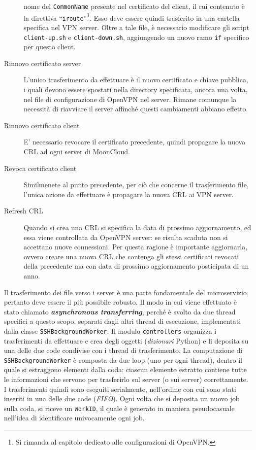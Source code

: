 \begin{description}
	nome del \texttt{CommonName} presente nel certificato del client, il cui
	contenuto è la direttiva ``\texttt{iroute}''\footnote{Si rimanda al capitolo dedicato
	alle configurazioni di OpenVPN.}. Esso deve essere quindi trasferito in una cartella
	specifica nel VPN server. Oltre a tale file, è necessario modificare gli script
	\texttt{client-up.sh} e \texttt{client-down.sh}, aggiungendo un nuovo ramo
	\texttt{if} specifico per questo client.
	\item[Rinnovo certificato server]L'unico trasferimento da effettuare è il nuovo
	certificato e chiave pubblica, i quali devono essere spostati nella directory
	specificata, ancora una volta, nel file di configurazione di OpenVPN nel server.
	Rimane comunque la necessità di riavviare il server affinché questi cambiamenti abbiano
	effetto.
	\item[Rinnovo certificato client]E' necessario revocare il certificato precedente,
	quindi propagare la nuova CRL ad ogni server di MoonCloud.
	\item[Revoca certificato client]Similmenete al punto precedente, per ciò che concerne
	il trasferimento file, l'unica azione da effettuare è propagare la nuova
	CRL ai VPN server.
	\item[Refresh CRL]Quando si crea una CRL si specifica la data di prossimo aggiornamento,
	ed essa viene controllata da OpenVPN server: se risulta scaduta non si accettano nuove
	connessioni. Per questa ragione è importante aggiornarla, ovvero creare una nuova
	CRL che contenga gli stessi certificati revocati della precedente ma con
	data di prossimo aggiornamento posticipata di un anno.
\end{description}

Il trasferimento dei file verso i server è una parte fondamentale del microservizio,
pertanto deve essere il più possibile robusto.
Il modo in cui viene effettuato è stato chiamato \textbf{\textit{asynchronous transferring}},
perché è svolto da due thread specifici a questo scopo, separati dagli altri thread di
esecuzione, implementati dalla classe \texttt{SSHBackgroundWorker}.
Il modulo \texttt{controllers} organizza i trasferimenti da effettuare e crea degli
oggetti (\textit{dizionari} Python) e li deposita su una delle due code condivise con i
thread di trasferimento.
La computazione di \texttt{SSHBackgroundWorker} è composta da due loop (uno per ogni thread), dentro
il quale si estraggono elementi dalla coda: ciascun elemento estratto contiene tutte le informazioni
che servono per trasferirlo sul server (o sui server) correttamente. I trasferimenti
quindi sono eseguiti serialmente, nell'ordine con cui sono stati inseriti
in una delle due code (\textit{FIFO}).
Ogni volta che si deposita un nuovo job sulla coda, si riceve un \texttt{WorkID}, il quale
è generato in maniera pseudocasuale nell'idea di identificare univocamente ogni job.

